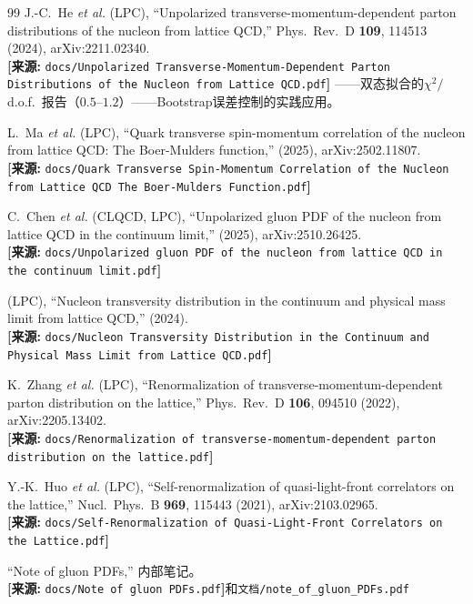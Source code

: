 \documentclass[12pt,a4paper]{ctexart}
\theoremstyle{definition}
\begin{document}
\begin{thebibliography}{99}
J.-C.~He \textit{et al.} (LPC),
``Unpolarized transverse-momentum-dependent parton distributions of the nucleon from lattice QCD,''
Phys.\ Rev.\ D \textbf{109}, 114513 (2024), arXiv:2211.02340.
\\\textbf{[来源:} \texttt{docs/Unpolarized Transverse-Momentum-Dependent Parton Distributions of the Nucleon from Lattice QCD.pdf}\textbf{]}
——双态拟合的$\chi^2/$d.o.f.\ 报告（$0.5\text{--}1.2$）——Bootstrap误差控制的实践应用。

L.~Ma \textit{et al.} (LPC),
``Quark transverse spin-momentum correlation of the nucleon from lattice QCD: The Boer-Mulders function,''
(2025), arXiv:2502.11807.
\\\textbf{[来源:} \texttt{docs/Quark Transverse Spin-Momentum Correlation of the Nucleon from Lattice QCD The Boer-Mulders Function.pdf}\textbf{]}

C.~Chen \textit{et al.} (CLQCD, LPC),
``Unpolarized gluon PDF of the nucleon from lattice QCD in the continuum limit,''
(2025), arXiv:2510.26425.
\\\textbf{[来源:} \texttt{docs/Unpolarized gluon PDF of the nucleon from lattice QCD in the continuum limit.pdf}\textbf{]}

(LPC),
``Nucleon transversity distribution in the continuum and physical mass limit from lattice QCD,''
(2024).
\\\textbf{[来源:} \texttt{docs/Nucleon Transversity Distribution in the Continuum and Physical Mass Limit from Lattice QCD.pdf}\textbf{]}

K.~Zhang \textit{et al.} (LPC),
``Renormalization of transverse-momentum-dependent parton distribution on the lattice,''
Phys.\ Rev.\ D \textbf{106}, 094510 (2022), arXiv:2205.13402.
\\\textbf{[来源:} \texttt{docs/Renormalization of transverse-momentum-dependent parton distribution on the lattice.pdf}\textbf{]}

Y.-K.~Huo \textit{et al.} (LPC),
``Self-renormalization of quasi-light-front correlators on the lattice,''
Nucl.\ Phys.\ B \textbf{969}, 115443 (2021), arXiv:2103.02965.
\\\textbf{[来源:} \texttt{docs/Self-Renormalization of Quasi-Light-Front Correlators on the Lattice.pdf}\textbf{]}

``Note of gluon PDFs,'' 内部笔记。
\\\textbf{[来源:} \texttt{docs/Note of gluon PDFs.pdf}\textbf{]}和\texttt{文档/note\_of\_gluon\_PDFs.pdf}

\end{thebibliography}
\end{document}
